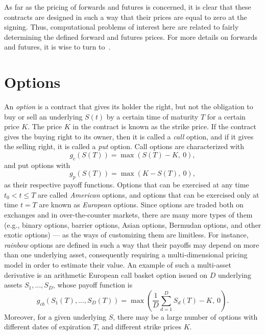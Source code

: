 \documentclass{UUThesisTemplate}
\begin{document}
\par
As far as the pricing of forwards and futures is concerned, it is clear that these contracts are designed in such a way that their prices are equal to zero at the signing. Thus, computational problems of interest here are related to fairly determining the defined forward and futures prices. For more details on forwards and futures, it is wise to turn to~\cite{duffie1989futures,hull2017options}.  
%





%
\section{Options}
\label{sec:options}

\par
An \emph{option} is a contract that gives its holder the right, but not the obligation to buy or sell an underlying $S(t)$ by a certain time of maturity $T$ for a certain price $K$. The price $K$ in the contract is known as the strike price. If the contract gives the buying right to its owner, then it is called a \emph{call} option, and if it gives the selling right, it is called a \emph{put} option. Call options are characterized with 
\begin{equation}
\label{eq:callop}
g_c(S(T))=\max(S(T)-K,\ 0),
\end{equation}
and put options with 
\begin{equation}
\label{eq:putop}
g_p(S(T))=\max(K-S(T),\ 0),
\end{equation}
as their respective payoff functions. Options that can be exercised at any time $t_0 < t \leq T$ are called \emph{American} options, and options that can be exercised only at time $t=T$ are known as \emph{European} options. Since options are traded both on exchanges and in over-the-counter markets, there are many more types of them (e.g., binary options, barrier options, Asian options, Bermudan options, and other exotic options) --- as the ways of customizing them are limitless. For instance, \emph{rainbow} options are defined in such a way that their payoffs may depend on more than one underlying asset, consequently requiring a multi-dimensional pricing model in order to estimate their value. An example of such a multi-asset derivative is an arithmetic European call basket option issued on $D$ underlying assets $S_1,\ldots,S_D$, whose payoff function is 
\begin{equation}
\label{eq:basketop}
g_{cb}(S_1(T),\ldots,S_D(T)) = \max\left(\frac{1}{D}\sum_{d=1}^D S_d(T) - K,\ 0\right).
\end{equation}
Moreover, for a given underlying $S$, there may be a large number of options with different dates of expiration $T$, and different strike prices $K$.
\end{document}
